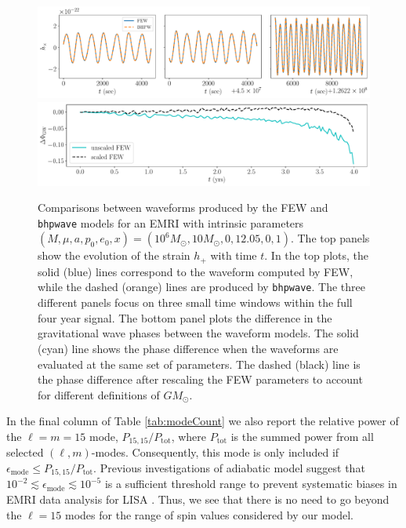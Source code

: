 \documentclass[%
 reprint,
 nofootinbib,
 amsmath,amssymb,
 aps,
 prd,
]{revtex4-2}
\begin{document}
\begin{figure}[!htp]
    \centering
    \includegraphics[width=0.98\linewidth]{figures/few_bhpwave_overlay.pdf}
    \includegraphics[width=0.98\linewidth]{figures/few_phase_comparison.pdf}
    \caption{Comparisons between waveforms produced by the FEW and \texttt{bhpwave} models for an EMRI with intrinsic parameters $(M, \mu, a, p_0, e_0, x) = (10^6 M_\odot, 10 M_\odot, 0, 12.05, 0, 1)$. The top panels show the evolution of the strain $h_+$ with time $t$. In the top plots, the solid (blue) lines correspond to the waveform computed by FEW, while the dashed (orange) lines are produced by \texttt{bhpwave}. The three different panels focus on three small time windows within the full four year signal. The bottom panel plots the difference in the gravitational wave phases between the waveform models. The solid (cyan) line shows the phase difference when the waveforms are evaluated at the same set of parameters. The dashed (black) line is the phase difference after rescaling the FEW parameters to account for different definitions of $GM_\odot$.}
    \label{fig:compareFEW}
\end{figure}


In the final column of Table \ref{tab:modeCount} we also report the relative power of the $\ell = m = 15$ mode, $P_{15,15}/P_\mathrm{tot}$, where $P_\mathrm{tot}$ is the summed power from all selected $(\ell, m)$-modes. Consequently, this mode is only included if $\epsilon_\mathrm{mode} \leq P_{15,15}/P_\mathrm{tot}$. Previous investigations of adiabatic model suggest that $ 10^{-2} \lesssim \epsilon_\mathrm{mode} \lesssim 10^{-5}$ is a sufficient threshold range to prevent systematic biases in EMRI data analysis for LISA \cite{KatzETC20}. Thus, we see that there is no need to go beyond the $\ell = 15$ modes for the range of spin values considered by our model.
\end{document}

